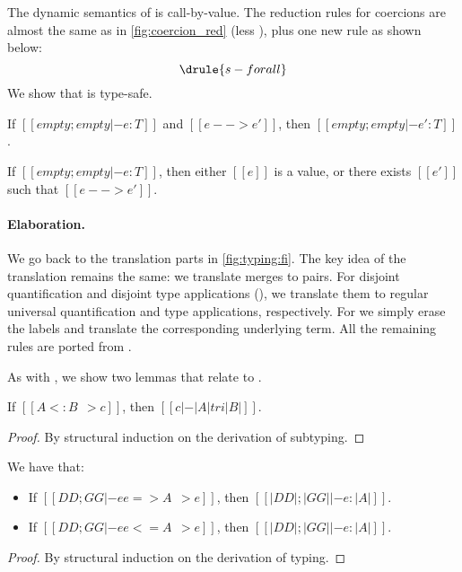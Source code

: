 The dynamic semantics of \tnamee is call-by-value. The reduction rules for coercions are almost the same as in
\cref{fig:coercion_red} (less ), plus one new rule  as shown below:
\[
  \drule{s-forall}
\]
We show that \tnamee is type-safe.

\begin{theorem}
  If $[[empty; empty |- e : T]]$ and $[[e --> e']]$, then $[[empty; empty |- e' : T]]$.
\end{theorem}

\begin{theorem}
  If $[[empty; empty |- e : T]]$, then either $[[e]]$ is a value, or there exists $[[e']]$ such
  that $[[e --> e']]$.
\end{theorem}


\paragraph{Elaboration.}

We go back to the translation parts in \cref{fig:typing:fi}. The key idea of the
translation remains the same: we translate merges to pairs. For disjoint
quantification and disjoint type applications (), we
translate them to regular universal quantification and type applications,
respectively. For  we simply erase
the labels and translate the corresponding underlying term. All the remaining
rules are ported from \namee.


As with \namee, we show two lemmas that relate \fnamee to \tnamee.

\begin{lemma}
  If $[[A <: B ~~> c]]$, then $[[c |-  |A| tri |B|]]$.
  \label{lemma:sub-correct:fi}
\end{lemma}
\begin{proof}
  By structural induction on the derivation of subtyping.
\end{proof}


\begin{lemma} We have that:
  \begin{itemize}
  \item If $[[DD ; GG |- ee => A ~~> e]]$, then $[[ |DD| ; |GG| |- e : |A | ]]$.
  \item If $[[DD ; GG |- ee <= A ~~> e]]$, then $[[ |DD| ; |GG| |- e : |A | ]]$.
  \end{itemize}
\end{lemma}
\begin{proof}
  By structural induction on the derivation of typing.
\end{proof}

